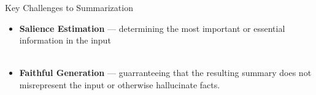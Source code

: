 \begin{frame}{Key Challenges to Summarization}

\begin{itemize}

    \item \textbf{Salience Estimation} --- determining the most important or essential 
information in the input
~\\
~\\
\item \textbf{Faithful Generation} --- guarranteeing that the resulting summary does not misrepresent the input or otherwise hallucinate facts.
\end{itemize}

\end{frame}


